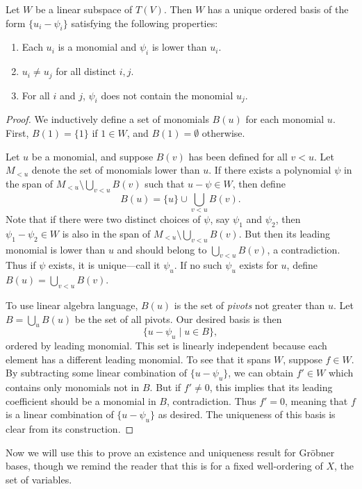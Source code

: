\begin{prop}\label{prop:rref}
	Let $W$ be a linear subspace of $T(V)$. Then $W$ has a unique ordered basis of the form $\{u_i - \psi_i\}$ satisfying the following properties:
	\begin{enumerate}
		\item Each $u_i$ is a monomial and $\psi_i$ is lower than $u_i$.
		\item $u_i \neq u_j$ for all distinct $i,j$.
		\item For all $i$ and $j$, $\psi_i$ does not contain the monomial $u_j$.
	\end{enumerate}
\end{prop}
\begin{proof}
	We inductively define a set of monomials $B(u)$ for each monomial $u$. First, $B(1) = \{1\}$ if $1 \in W$, and $B(1) = \emptyset$ otherwise.
	
	Let $u$ be a monomial, and suppose $B(v)$ has been defined for all $v < u$. Let $M_{<u}$ denote the set of monomials lower than $u$. If there exists a polynomial $\psi$ in the span of $M_{<u} \setminus \bigcup_{v<u} B(v)$ such that $u - \psi \in W$, then define
	\[
		B(u) = \{u\} \cup \bigcup_{v<u} B(v).
	\]
	Note that if there were two distinct choices of $\psi$, say $\psi_1$ and $\psi_2$, then $\psi_1 - \psi_2 \in W$ is also in the span of $M_{<u} \setminus \bigcup_{v<u} B(v)$. But then its leading monomial is lower than $u$ and should belong to $\bigcup_{v<u} B(v)$, a contradiction. Thus if $\psi$ exists, it is unique---call it $\psi_u$. If no such $\psi_u$ exists for $u$, define $B(u) = \bigcup_{v<u} B(v)$.
	
	To use linear algebra language, $B(u)$ is the set of \emph{pivots} not greater than $u$. Let $B = \bigcup_u B(u)$ be the set of all pivots. Our desired basis is then
	\[
		\{u - \psi_u \mid u \in B\},
	\]
	ordered by leading monomial. This set is linearly independent because each element has a different leading monomial. To see that it spans $W$, suppose $f\in W$. By subtracting some linear combination of $\{u - \psi_u\}$, we can obtain $f' \in W$ which contains only monomials not in $B$. But if $f' \neq 0$, this implies that its leading coefficient should be a monomial in $B$, contradiction. Thus $f' = 0$, meaning that $f$ is a linear combination of $\{u - \psi_u\}$ as desired. The uniqueness of this basis is clear from its construction.
\end{proof}
Now we will use this to prove an existence and uniqueness result for Gr\"obner bases, though we remind the reader that this is for a fixed well-ordering of $X$, the set of variables.
